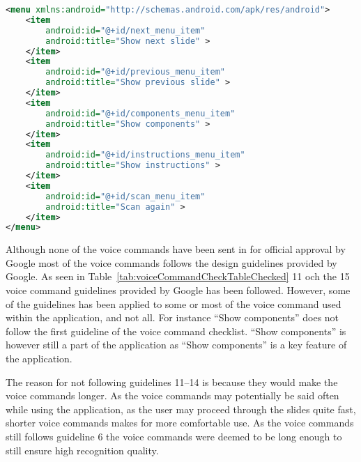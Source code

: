 \begin{lstlisting}[language=XML, caption={The voice command menu XML file}, label=voiceCommandXML]
<menu xmlns:android="http://schemas.android.com/apk/res/android">
	<item
		android:id="@+id/next_menu_item"
		android:title="Show next slide" >
	</item>
	<item
		android:id="@+id/previous_menu_item"
		android:title="Show previous slide" >
	</item>
	<item
		android:id="@+id/components_menu_item"
		android:title="Show components" >
	</item>
	<item
		android:id="@+id/instructions_menu_item"
		android:title="Show instructions" >
	</item>
	<item
		android:id="@+id/scan_menu_item"
		android:title="Scan again" >
	</item>
</menu>
\end{lstlisting}

Although none of the voice commands have been sent in for official approval by Google most of the voice commands follows the design guidelines provided by Google. As seen in Table~\ref{tab:voiceCommandCheckTableChecked} 11 och the 15 voice command guidelines provided by Google has been followed. However, some of the guidelines has been applied to some or most of the voice command used within the application, and not all. For instance ``Show components'' does not follow the first guideline of the voice command checklist. ``Show components'' is however still a part of the application as ``Show components'' is a key feature of the application.



The reason for not following guidelines 11--14 is because they would make the voice commands longer. As the voice commands may potentially be said often while using the application, as the user may proceed through the slides quite fast, shorter voice commands makes for more comfortable use. As the voice commands still follows guideline 6 the voice commands were deemed to be long enough to still ensure high recognition quality.